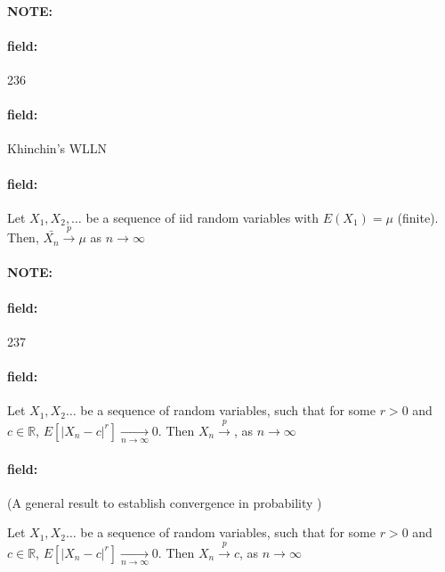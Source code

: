 \documentclass[12pt]{article}
\newenvironment{note}{\paragraph{NOTE:}}{}
\newenvironment{field}{\paragraph{field:}}{}
\begin{document}
\begin{note} \begin{field} \tiny 236 \end{field}
  \begin{field}
    Khinchin's WLLN
  \end{field}
  \begin{field}
    Let $X_1, X_2, \ldots$ be a sequence of iid random variables with $E(X_1) = \mu$ (finite). Then, $\bar{X_n} \overset{p}{\to} \mu$ as $n \to \infty$
  \end{field}
\end{note}


\begin{note} \begin{field} \tiny 237 \end{field}
    \begin{field}
      Let $X_1, X_2 \ldots$ be a sequence of random variables, such that for some $r > 0$ and $c \in \mathbb{R}$, $E[|X_n - c|^r] \underset{n \to \infty}{\to} 0$. Then $X_n \overset{p}{\to} $, as $n \to \infty$
    \end{field}
    \begin{field}
      (A general result to establish convergence in probability )

      Let $X_1, X_2 \ldots$ be a sequence of random variables, such that for some $r > 0$ and $c \in \mathbb{R}$, $E[|X_n - c|^r] \underset{n \to \infty}{\to} 0$. Then $X_n \overset{p}{\to} c$, as $n \to \infty$
    \end{field}
\end{note}
\end{document}

